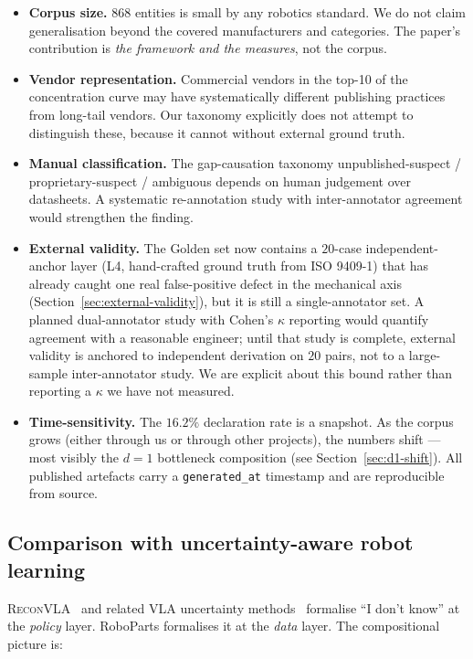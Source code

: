 \documentclass[11pt,twocolumn]{article}
\begin{document}
\begin{itemize}[nosep,leftmargin=*]
\item \textbf{Corpus size.} $868$ entities is small by any robotics
standard. We do not claim generalisation beyond the covered
manufacturers and categories. The paper's contribution is
\emph{the framework and the measures}, not the corpus.

\item \textbf{Vendor representation.} Commercial vendors in the top-10
of the concentration curve may have systematically different
publishing practices from long-tail vendors. Our taxonomy explicitly
does not attempt to distinguish these, because it cannot without
external ground truth.

\item \textbf{Manual classification.} The gap-causation taxonomy
unpublished-suspect / proprietary-suspect / ambiguous depends on
human judgement over datasheets. A systematic re-annotation study
with inter-annotator agreement would strengthen the finding.

\item \textbf{External validity.} The Golden set now contains a
$20$-case independent-anchor layer (L4, hand-crafted ground truth
from ISO 9409-1) that has already caught one real false-positive
defect in the mechanical axis (Section~\ref{sec:external-validity}),
but it is still a single-annotator set. A planned dual-annotator
study with Cohen's $\kappa$ reporting would quantify agreement with
a reasonable engineer; until that study is complete, external
validity is anchored to independent derivation on $20$ pairs, not to
a large-sample inter-annotator study. We are explicit about this
bound rather than reporting a $\kappa$ we have not measured.

\item \textbf{Time-sensitivity.} The $16.2\%$ declaration rate is a
snapshot. As the corpus grows (either through us or through other
projects), the numbers shift --- most visibly the $d=1$ bottleneck
composition (see Section~\ref{sec:d1-shift}). All published
artefacts carry a \texttt{generated\_at} timestamp and are
reproducible from source.
\end{itemize}

\subsection{Comparison with uncertainty-aware robot learning}

\textsc{ReconVLA}~\cite{R10} and related VLA uncertainty
methods~\cite{R11} formalise ``I don't know'' at the \emph{policy}
layer. RoboParts formalises it at the \emph{data} layer. The
compositional picture is:
\end{document}
